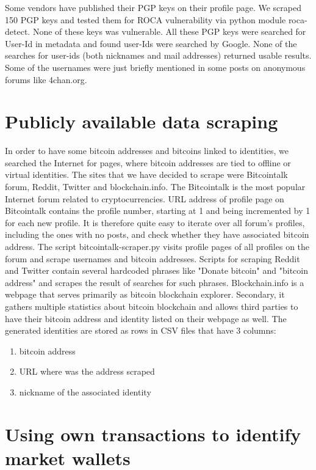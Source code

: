 \documentclass[
  digital, %
  table,   %
  lof,     %
  lot,     %
  oneside
]{fithesis3}
\begin{document}
Some vendors have published their PGP keys on their profile page.
We scraped 150 PGP keys and tested them for ROCA vulnerability via python module roca-detect. None of these keys was vulnerable.
All these PGP keys were searched for User-Id in metadata and found user-Ids were searched by Google.
None of the searches for user-ids (both nicknames and mail addresses) returned usable results.
Some of the usernames were just briefly mentioned in some posts on anonymous forums like 4chan.org.

\section{Publicly available data scraping}
\label{Publicly available data scraping}

In order to have some bitcoin addresses and bitcoins linked to identities,
we searched the Internet for pages, where bitcoin addresses are tied to offline or virtual identities.
The sites that we have decided to scrape were Bitcointalk forum, Reddit, Twitter and blockchain.info.
The Bitcointalk is the most popular Internet forum
related to cryptocurrencies. URL address of profile page on Bitcointalk
contains the profile number, starting at 1 and being incremented by 1
for each new profile. It is therefore quite easy to iterate over all forum's profiles,
including the ones with no posts, and check whether they have associated bitcoin address.
The script bitcointalk-scraper.py visits profile pages of all profiles on the forum and scrape usernames and bitcoin addresses. 
Scripts for scraping Reddit and Twitter contain several hardcoded phrases like "Donate bitcoin" and "bitcoin address" and scrapes 
the result of searches for such phrases.
Blockchain.info is a webpage that serves primarily as bitcoin blockchain explorer. Secondary,
it gathers multiple statistics about bitcoin blockchain and allows
third parties to have their bitcoin address and identity listed on their webpage as well.
The generated identities are stored as rows in CSV files that have 3 columns:

\begin{enumerate}
 \item bitcoin address
 \item URL where was the address scraped
 \item nickname of the associated identity
\end{enumerate}



\section{Using own transactions to identify market wallets}
\label{Using own transactions to identify market wallets}
\end{document}
